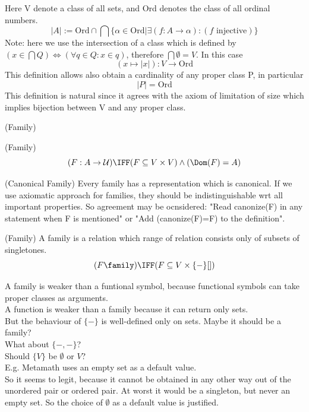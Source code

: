 Here V denote a class of all sets, and Ord denotes the class of all ordinal numbers.
\[
|A|:=\mbox{Ord}\cap\bigcap \{\alpha\in\mbox{Ord}|\exists (f:A\to\alpha):(f\mbox{ injective})\}
\]
Note: here we use the intersection of a class which is defined by 
$
(x\in\bigcap Q)\iff(\forall q\in Q:x\in q)
$, therefore $\bigcap\emptyset = V$.
In this case 
\[
(x\mapsto|x|):V\to\mbox{Ord}
\]
This definition allows also obtain a cardinality of any proper class P, in particular
\[
|P|=\mbox{Ord}
\]
This definition is natural since it agrees with the axiom of limitation of size which implies bijection between V and any proper class.


\begin{definition}(Family)
\[
\]
\end{definition}

\begin{definition}(Family)
\[
(F:A\to\mathcal{U})
\IFF
(F\subseteq V\times V)
\land
(\Dom(F)=A)
\]
\end{definition}
\begin{definition}(Canonical Family)
Every family has a representation which is canonical.
If we use axiomatic approach for families, they should be indistinguishable wrt all important properties.
So agreement may be ocnsidered: "Read canonize(F) in any statement when F is mentioned" or "Add (canonize(F)=F) to the definition".
\end{definition}



\begin{definition}(Family)
A family is a relation which range of relation consists only of subsets of singletones.
\[
(F\family) \IFF (F\subseteq V\times\{-\}[])
\]
\end{definition}
A family is weaker than a funtional symbol, because functional symbols can take proper classes as arguments.\\
A function is weaker than a family because it can return only sets.\\
But the behaviour of $\{-\}$ is well-defined only on sets.
Maybe it should be a family?\\
What about $\{-,-\}$?\\
Should $\{V\}$ be $\emptyset$ or $V$?\\
E.g. Metamath uses an empty set as a default value.\\
So it seems to legit, because it cannot be obtained in any other way out of the unordered pair or ordered pair. At worst it would be a singleton, but never an empty set. So the choice of $\emptyset$ as a default value is justified.\\

